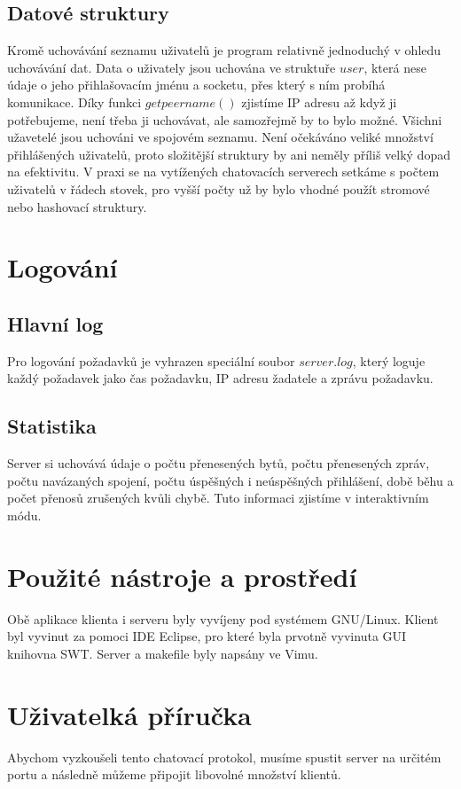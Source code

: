 \documentclass[12pt,titlepage]{article}
\begin{document}
\subsection{Datové struktury}
Kromě uchovávání seznamu uživatelů je program relativně jednoduchý v ohledu
uchovávání dat. Data o uživately jsou uchována ve struktuře $user$, která nese
údaje o jeho přihlašovacím jménu a socketu, přes který s ním probíhá
komunikace. Díky funkci $getpeername()$ zjistíme IP adresu až když ji
potřebujeme, není třeba ji uchovávat, ale samozřejmě by to bylo možné.  Všichni
užavetelé jsou uchováni ve spojovém seznamu. Není očekáváno veliké množství
přihlášených uživatelů, proto složitější struktury by ani neměly příliš velký
dopad na efektivitu. V praxi se na vytížených chatovacích serverech setkáme s
počtem uživatelů v řádech stovek, pro vyšší počty už by bylo vhodné použít
stromové nebo hashovací struktury.


\section{Logování}
\subsection{Hlavní log}
Pro logování požadavků je vyhrazen speciální
soubor $server.log$, který loguje každý požadavek jako čas požadavku, IP adresu
žadatele a zprávu požadavku.

\subsection{Statistika}
Server si uchovává údaje o počtu přenesených bytů, počtu přenesených zpráv,
počtu navázaných spojení, počtu úspěšných i neúspěšných přihlášení, době běhu a
počet přenosů zrušených kvůli chybě. Tuto informaci zjistíme v interaktivním
módu. 

\section{Použité nástroje a prostředí}
Obě aplikace klienta i serveru byly vyvíjeny pod systémem GNU/Linux. Klient byl
vyvinut za pomoci IDE Eclipse, pro které byla prvotně vyvinuta GUI knihovna
SWT. Server a makefile byly napsány ve Vimu.


\section{Uživatelká příručka}
Abychom vyzkoušeli tento chatovací protokol, musíme spustit server na určitém
portu a následně můžeme připojit libovolné množství klientů.
\end{document}
